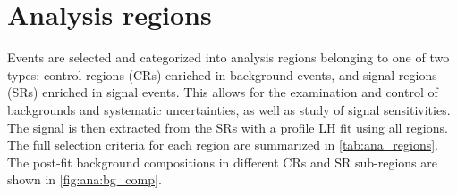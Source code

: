 \documentclass[../thesis.tex]{subfiles}
\begin{document}
\section{Analysis regions}
\label{sec:ana}
Events are selected and categorized into analysis regions belonging to one of two types: control regions (\acs{CR}s) enriched in background events, and signal regions (\acs{SR}s) enriched in signal events. This allows for the examination and control of backgrounds and systematic uncertainties, as well as study of signal sensitivities. The signal is then extracted from the \acs{SR}s with a profile \acs{LH} fit using all regions. The full selection criteria for each region are summarized in \autoref{tab:ana_regions}. The post-fit background compositions in different \acs{CR}s and \acs{SR} sub-regions are shown in \autoref{fig:ana:bg_comp}.
\end{document}
